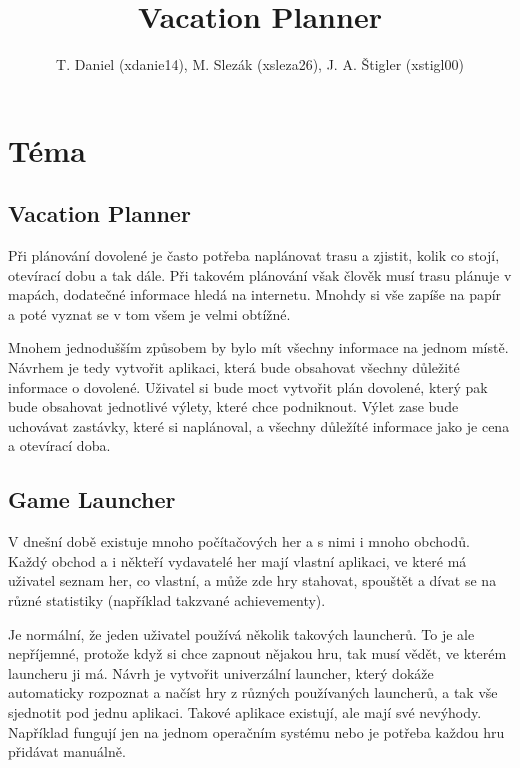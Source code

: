 \documentclass{article}
\title{Vacation Planner}
\author{
    T. Daniel (xdanie14),
    M. Slezák (xsleza26),
    J. A. Štigler (xstigl00)
}
\begin{document}
\maketitle

\newpage

\section{Téma}

\subsection{Vacation Planner}
Při plánování dovolené je často potřeba naplánovat trasu a zjistit,
kolik co stojí, otevírací dobu a tak dále. Při takovém plánování však člověk
musí trasu plánuje v mapách, dodatečné informace hledá na internetu. Mnohdy
si vše zapíše na papír a poté vyznat se v tom všem je velmi obtížné.

Mnohem jednodušším způsobem by bylo mít všechny informace na jednom místě.
Návrhem je tedy vytvořit aplikaci, která bude obsahovat všechny důležité
informace o dovolené. Uživatel si bude moct vytvořit plán dovolené, který
pak bude obsahovat jednotlivé výlety, které chce podniknout. Výlet zase bude
uchovávat zastávky, které si naplánoval, a všechny důležíté informace jako je
cena a otevírací doba.

\subsection{Game Launcher}
V dnešní době existuje mnoho počítačových her a s nimi i mnoho obchodů.
Každý obchod a i někteří vydavatelé her mají vlastní aplikaci, ve které má
uživatel seznam her, co vlastní, a může zde hry stahovat, spouštět a dívat se
na různé statistiky (například takzvané achievementy).

Je normální, že jeden uživatel používá několik takových launcherů. To je ale
nepříjemné, protože když si chce zapnout nějakou hru, tak musí vědět, ve kterém
launcheru ji má. Návrh je vytvořit univerzální launcher, který dokáže
automaticky rozpoznat a načíst hry z různých používaných launcherů, a tak vše
sjednotit pod jednu aplikaci. Takové aplikace existují, ale mají své nevýhody.
Například fungují jen na jednom operačním systému nebo je potřeba každou hru
přidávat manuálně.
\end{document}
